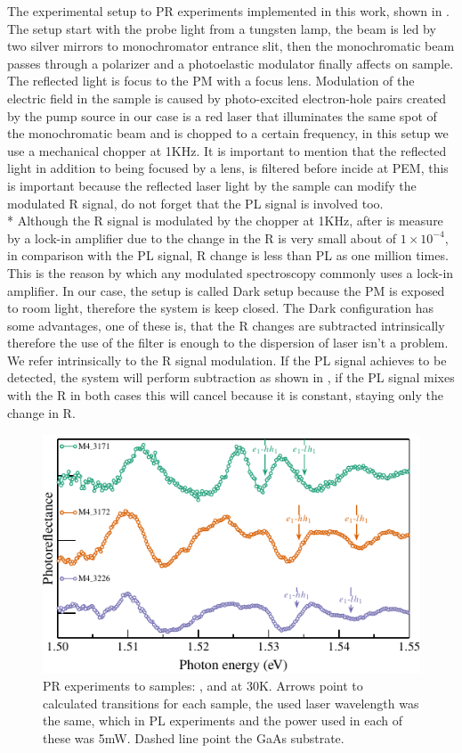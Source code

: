 The experimental setup to PR experiments implemented in this work, shown in . The setup start with the probe light from a tungsten lamp, the beam is led by two silver mirrors to monochromator entrance slit, then the monochromatic beam passes through a polarizer and a photoelastic modulator finally affects on sample. The reflected light is focus to the PM with a focus lens. Modulation of the electric field in the sample is caused by photo-excited electron-hole pairs created by the pump source in our case is a red laser that illuminates the same spot of the monochromatic beam and is chopped to a certain frequency, in this setup we use a mechanical chopper at 1KHz. It is important to mention that the reflected light in addition to being  focused by a lens, is filtered before incide at PEM, this is important because the reflected laser light by the sample can modify the modulated R signal, do not forget that the PL signal is involved too. \\*
Although the R signal is modulated by the chopper at 1KHz, after is measure by a lock-in amplifier due to the change in the R is very small about of  $1\times 10^{-4}$,  in comparison with the  PL signal, R change is less than PL as one million times. This is the reason by which any modulated spectroscopy commonly uses a lock-in amplifier. In our case, the setup is called Dark\cite{misiewicz1999photoreflectance} setup because the PM is exposed to room light, therefore the system is keep closed. The  Dark configuration has some advantages, one of these is, that the R changes are subtracted intrinsically therefore the use of the filter is enough to the dispersion of laser isn't a problem.  We refer intrinsically to the R signal modulation. If the PL signal achieves to be detected,  the system will perform subtraction as shown in , if the PL signal mixes with the R in both cases this will cancel because it is constant,  staying only the change in R. 
\begin{figure}[ht!]
	\centering
	\includegraphics[width=\textwidth]{../figures/chapter-3/pr-plots/build/pr-set1.pdf}
	\caption{ PR experiments to samples: ,  and  at 30K. Arrows point to calculated transitions for each sample, the used laser wavelength was the same, which in PL experiments and the power used in each of these was 5mW. Dashed line point the GaAs substrate.}
	\label{fig:chapter-3-PR-PLOT-SET1}
\end{figure}

